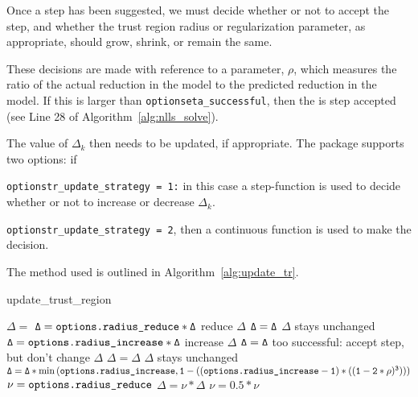 Once a step has been suggested, we must decide whether or not to accept the step, and whether the trust region radius or regularization parameter, as appropriate, should grow, shrink, or remain the same.  

These decisions are made with reference to a parameter, $\rho$, which measures the 
ratio of the actual reduction in the model to the predicted reduction in the model.
If this is larger than {\tt options\ct eta\_successful}, then the is step accepted (see Line 28 of Algorithm~\ref{alg:nlls_solve}). 

The value of $\Delta_k$ then needs to be updated, if appropriate.  
The package supports two options: if
\begin{description}
\item  {\tt options\ct tr\_update\_strategy = 1:} in this case a step-function is used to decide whether or not to increase or decrease $\Delta_k$.  
\item {\tt options\ct tr\_update\_strategy = 2}, then a continuous function is used to
  make the decision.  
\end{description}
The method used is outlined in Algorithm~\ref{alg:update_tr}.

\begin{algorithm}
\caption{update\_trust\_region}
\label{alg:update_tr}
\begin{algorithmic}[1]    
   $\Delta = $ 
      \State $\tt \Delta = \text{\tt options.radius\_reduce} * \Delta$
      \Comment reduce $\Delta$
      \State $\tt \Delta = \Delta$
      \Comment $\Delta$ stays unchanged
      \State $\tt \Delta = \text{\tt options.radius\_increase} * \Delta$
      \Comment increase $\Delta$
      \State $\tt \Delta = \Delta$
      \Comment too successful: accept step, but don't change $\Delta$
      \EndIf
    \State [on first call, set $\nu = 2.0$]
        \State $\Delta = \Delta$
        \Comment $\Delta$ stays unchanged
        \State $\tt \Delta = \Delta * \min\left(\text{\tt options.radius\_increase},  
          1 - \left( (\text{\tt options.radius\_increase} -1)*((1 - 2*\rho)^3)  \right)\right)$
        \State $\tt \nu = \text{\tt options.radius\_reduce}$
        \State $ \Delta = \nu * \Delta$
        \State $ \nu = 0.5 * \nu$
      \EndIf
    \EndIf
  \end{algorithmic}
\end{algorithm}
 


